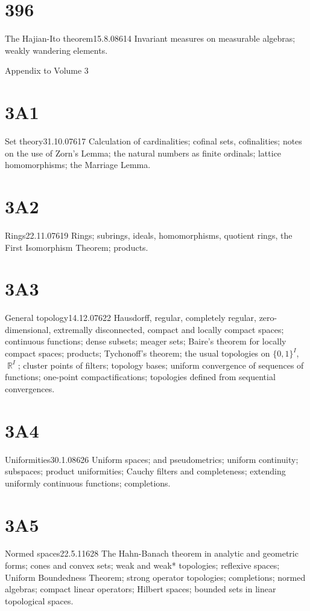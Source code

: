 \section{396}{The Hajian-Ito theorem}{15.8.08}{614}{}
{Invariant measures on measurable algebras;  weakly wandering
elements.}
     
     
 Appendix to Volume 3
     
     
\section{3A1}{Set theory}{31.10.07}{617}{}
{Calculation of cardinalities;   cofinal sets,
cofinalities;  notes on the use of Zorn's Lemma;  the natural numbers as
finite ordinals;  lattice homomorphisms;  the Marriage Lemma.}
     
\section{3A2}{Rings}{22.11.07}{619}{}
{Rings;  subrings, ideals, homomorphisms, quotient rings, the
First Isomorphism Theorem;  products.}
     
\section{3A3}{General topology}{14.12.07}{622}{}
{Hausdorff, regular, completely regular, zero-dimensional,
extremally disconnected, compact and locally compact spaces;  continuous
functions;  dense subsets;  meager sets;  Baire's theorem for locally
compact spaces;  products;  Tychonoff's theorem;  the usual topologies
on $\{0,1\}^I$, $\BbbR^I$;  cluster points of filters;  topology bases;
uniform convergence of sequences of functions;  one-point
compactifications;  topologies defined from sequential convergences.}
     
\section{3A4}{Uniformities}{30.1.08}{626}{}
{Uniform spaces;  and pseudometrics;  uniform continuity;
subspaces;  product uniformities;  Cauchy filters and completeness;
extending uniformly continuous functions;  completions.}
     
\section{3A5}{Normed spaces}{22.5.11}{628}{}
{The Hahn-Banach theorem in analytic and geometric forms;  cones
and convex sets;  weak and weak* topologies;  reflexive spaces;
Uniform Boundedness Theorem;  strong operator topologies;
completions;  normed algebras;  compact
linear operators;  Hilbert spaces;  bounded sets in linear topological
spaces.}
     
